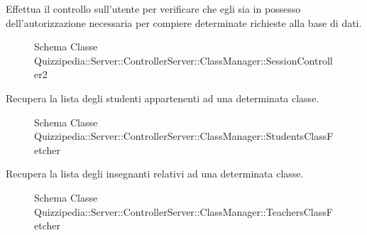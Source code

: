 Effettua il controllo sull'utente per verificare che egli sia in possesso dell'autorizzazione necessaria per compiere determinate richieste alla base di dati.
\begin{figure}[H]
\centering
\noindent{}
\caption{Schema Classe Quizzipedia::Server::ControllerServer::ClassManager::SessionController2}
\end{figure}
Recupera la lista degli studenti appartenenti ad una determinata classe.
\begin{figure}[H]
\centering
\noindent{}
\caption{Schema Classe Quizzipedia::Server::ControllerServer::ClassManager::StudentsClassFetcher}
\end{figure}
Recupera la lista degli insegnanti relativi ad una determinata classe.
\begin{figure}[H]
\centering
\noindent{}
\caption{Schema Classe Quizzipedia::Server::ControllerServer::ClassManager::TeachersClassFetcher}
\end{figure}
